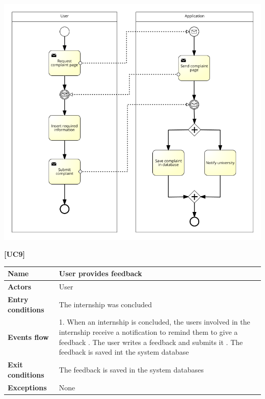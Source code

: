 \documentclass[11pt,twoside]{article}
\begin{document}
\begin{center}
\includegraphics[width=\textwidth]{Images/UC8}
\end{center}

\newpage

\large{\textbf{[UC9]}}
\begin{table}[H]
\begin{tabular}{| p{} | p{} |}
\hline
\textbf{Name}
& User provides feedback \\
\hline
\textbf{Actors}
& User \\
\hline
\textbf{Entry conditions}
& The internship was concluded \\
\hline
\textbf{Events flow}
& 1. When an internship is concluded, the users involved in the internship receive a notification to remind them to give a feedback \newline
2. The user writes a feedback and submits it \newline
3. The feedback is saved int the system database \\
\hline
\textbf{Exit conditions}
& The feedback is saved in the system databases \\
\hline
\textbf{Exceptions}
& None \\
\hline
\end{tabular}
\end{table}
\end{document}
